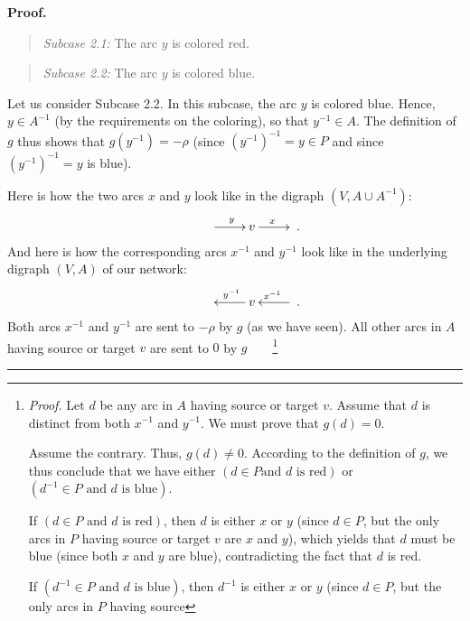 \documentclass[numbers=enddot,12pt,final,onecolumn,notitlepage]{scrartcl}%
\theoremstyle{definition}
\newenvironment{statement}{\begin{quote}}{\end{quote}}
\newenvironment{proof}[1][Proof]{\noindent\textbf{#1.} }{\ \rule{0.5em}{0.5em}}
\begin{document}
\begin{proof}
\begin{statement}
\textit{Subcase 2.1:} The arc $y$ is colored red.
\end{statement}

\begin{statement}
\textit{Subcase 2.2:} The arc $y$ is colored blue.
\end{statement}

Let us consider Subcase 2.2. In this subcase, the arc $y$ is colored blue.
Hence, $y\in A^{-1}$ (by the requirements on the coloring), so that $y^{-1}\in
A$. The definition of $g$ thus shows that $g\left(  y^{-1}\right)  =-\rho$
(since $\left(  y^{-1}\right)  ^{-1}=y\in P$ and since $\left(  y^{-1}\right)
^{-1}=y$ is blue).

Here is how the two arcs $x$ and $y$ look like in the digraph $\left(  V,A\cup
A^{-1}\right)  $:%
\[%
\xymatrix{
& \ar[r]^y & v \ar[r]^x &
}%
.
\]
And here is how the corresponding arcs $x^{-1}$ and $y^{-1}$ look like in the
underlying digraph $\left(  V,A\right)  $ of our network:%
\begin{equation}%
\xymatrix{
& & v \ar[l]_{y^{-1}} & \ar[l]_{x^{-1}}
}%
. \label{pf.lem.6.a.sc2.2.3}%
\end{equation}
Both arcs $x^{-1}$ and $y^{-1}$ are sent to $-\rho$ by $g$ (as we have seen).
All other arcs in $A$ having source or target $v$ are sent to $0$ by
$g$\ \ \ \ \footnote{\textit{Proof.} Let $d$ be any arc in $A$ having source
or target $v$. Assume that $d$ is distinct from both $x^{-1}$ and $y^{-1}$. We
must prove that $g\left(  d\right)  =0$.
\par
Assume the contrary. Thus, $g\left(  d\right)  \neq0$. According to the
definition of $g$, we thus conclude that we have either $\left(  d\in P\text{
and }d\text{ is red}\right)  $ or $\left(  d^{-1}\in P\text{ and }d\text{ is
blue}\right)  $.
\par
If $\left(  d\in P\text{ and }d\text{ is red}\right)  $, then $d$ is either
$x$ or $y$ (since $d\in P$, but the only arcs in $P$ having source or target
$v$ are $x$ and $y$), which yields that $d$ must be blue (since both $x$ and
$y$ are blue), contradicting the fact that $d$ is red.
\par
If $\left(  d^{-1}\in P\text{ and }d\text{ is blue}\right)  $, then $d^{-1}$
is either $x$ or $y$ (since $d\in P$, but the only arcs in $P$ having source
}
\end{proof}
\end{document}
